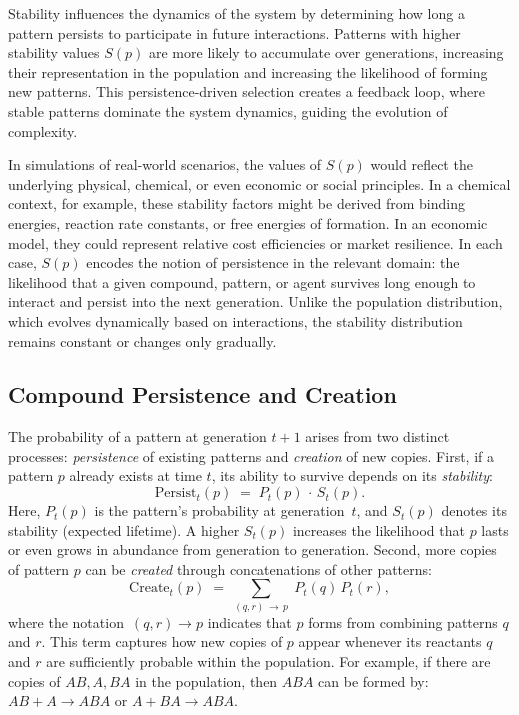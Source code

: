 \documentclass[entropy,article,submit,pdftex,moreauthors]{Definitions/mdpi}
\begin{document}
Stability influences the dynamics of the system by determining how long a pattern persists to participate in future interactions. Patterns with higher stability values \( S(p) \) are more likely to accumulate over generations, increasing their representation in the population and increasing the likelihood of forming new patterns. This persistence-driven selection creates a feedback loop, where stable patterns dominate the system dynamics, guiding the evolution of complexity. 

In simulations of real-world scenarios, the values of \(S(p)\) would reflect the underlying physical, chemical, or even economic or social principles. In a chemical context, for example, these stability factors might be derived from binding energies, reaction rate constants, or free energies of formation. In an economic model, they could represent relative cost efficiencies or market resilience. In each case, \(S(p)\) encodes the notion of persistence in the relevant domain: the likelihood that a given compound, pattern, or agent survives long enough to interact and persist into the next generation. Unlike the population distribution, which evolves dynamically based on interactions, the stability distribution remains constant or changes only gradually. 

\subsection{Compound Persistence and Creation}

The probability of a pattern at generation \(t+1\) arises from two distinct processes:
\emph{persistence} of existing patterns and \emph{creation} of new copies. First, if a pattern \(p\) already exists at time \(t\), its ability to survive depends on its \emph{stability}:
\begin{equation}
\label{eq:persist-term}
\mathrm{Persist}_t(p) 
\;=\; 
P_t(p)\,\cdot\,S_t(p).
\end{equation}
Here, \(P_t(p)\) is the pattern's probability at generation~\(t\), and \(S_t(p)\) denotes its stability (expected lifetime). A higher \(S_t(p)\) increases the likelihood that \(p\) lasts or even grows in abundance from generation to generation. Second, more copies of pattern \(p\) can be \emph{created} through concatenations of other patterns:
\begin{equation}
\label{eq:create-term}
\mathrm{Create}_t(p)
\;=\;
\sum_{(q,r)\,\to\,p}\;P_t(q)\,P_t(r),
\end{equation}
where the notation \(\,(q,r)\to p\) indicates that \(p\) forms from combining patterns \(q\) and \(r\). This term captures how new copies of \(p\) appear whenever its reactants \(q\) and \(r\) are sufficiently probable within the population. For example, if there are copies of $AB, A, BA$ in the population, then $ABA$ can be formed by: $AB + A \to ABA$ or $A + BA \to ABA$. 
\end{document}

